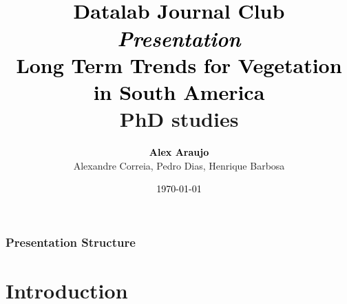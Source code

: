 \documentclass[11pt]{beamer}
\begin{document}
\title[
  \textbf{\textcolor{blue}{
    Presentation
  }} 
]{\\[0.01cm]
  \large{\textbf{\textcolor{black}{
    Datalab Journal Club 
  }}} \\
  
  \small{\textcolor{black}{
    \emph{Presentation}
  }} \\[0.50cm]

  \large{\textbf{\textcolor{black}{
	  Long Term Trends for Vegetation in South America 
  }}} \\
    \small{PhD studies}
} 

\author{
  \textcolor{black}{\textbf{
      Alex Araujo 
  }} \\
    \small{Alexandre Correia, Pedro Dias, Henrique Barbosa}
} 


\date{
  \textcolor{black}{
    \today
  }
}

%
%

{
  \begin{frame}
    \titlepage 
  \end{frame}
}

\begin{frame}
  \frametitle{\normalsize{\textbf{
    Presentation Structure
  }}}
  
  \tableofcontents
  
\end{frame}

\section{Introduction}
\end{document}
